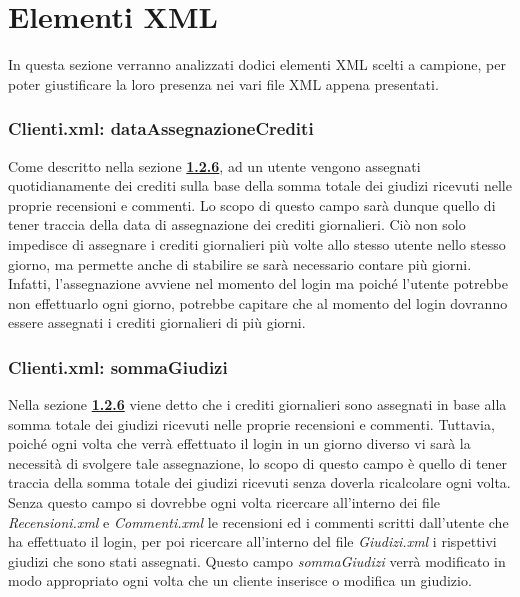\documentclass [a4paper, 12pt]{book}
\begin{document}
\medskip

\section{Elementi XML}
In questa sezione verranno analizzati dodici elementi XML scelti a campione, per poter giustificare la loro presenza nei vari file XML appena presentati.

\subsubsection{Clienti.xml: dataAssegnazioneCrediti}
Come descritto nella sezione \hyperref[Crediti]{\textbf{1.2.6}}, ad un utente vengono assegnati quotidianamente dei crediti sulla base della somma totale dei giudizi ricevuti nelle proprie recensioni e commenti. Lo scopo di questo campo sarà dunque quello di tener traccia della data di assegnazione dei crediti giornalieri. Ciò non solo impedisce di assegnare i crediti giornalieri più volte allo stesso utente nello stesso giorno, ma permette anche di stabilire se sarà necessario contare più giorni. Infatti, l'assegnazione avviene nel momento del login ma poiché l'utente potrebbe non effettuarlo ogni giorno, potrebbe capitare che al momento del login dovranno essere assegnati i crediti giornalieri di più giorni.

\subsubsection{Clienti.xml: sommaGiudizi}
Nella sezione \hyperref[Crediti]{\textbf{1.2.6}} viene detto che i crediti giornalieri sono assegnati in base alla somma totale dei giudizi ricevuti nelle proprie recensioni e commenti. Tuttavia, poiché ogni volta che verrà effettuato il login in un giorno diverso vi sarà la necessità di svolgere tale assegnazione, lo scopo di questo campo è quello di tener traccia della somma totale dei giudizi ricevuti senza doverla ricalcolare ogni volta. Senza questo campo si dovrebbe ogni volta ricercare all'interno dei file \textit{Recensioni.xml} e \textit{Commenti.xml} le recensioni ed i commenti scritti dall'utente che ha effettuato il login, per poi ricercare all'interno del file \textit{Giudizi.xml} i rispettivi giudizi che sono stati assegnati. Questo campo \textit{sommaGiudizi} verrà modificato in modo appropriato ogni volta che un cliente inserisce o modifica un giudizio. 
\end{document}
